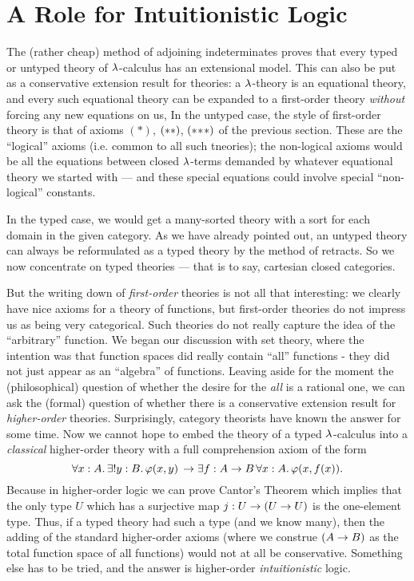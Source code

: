 \section{A Role for Intuitionistic Logic}

The (rather cheap) method of adjoining indeterminates proves that every typed or untyped theory of $\l$-calculus has an extensional model. This can also be put as a conservative extension result for theories: a $\l$-theory is an equational theory, and every such equational theory can be expanded to a first-order theory {\it without} forcing any new equations on us,  In the untyped case, the style of first-order theory is that of axioms $(*)$, $\ss$, $\sss$ of the previous section. These are the ``logical'' axioms (i.e. common to all such tneories); the non-logical axioms would be all the equations between closed $\l$-terms demanded by whatever equational theory we started with --- and these special equations could involve special ``non-logical'' constants.

In the typed case, we would get a many-sorted theory with a sort for each domain in the given category. As we have already pointed out, an untyped theory can always be reformulated as a typed theory by the method of retracts. So we now concentrate on typed theories --- that is to say, cartesian closed categories.

But the writing down of {\it first-order} theories is not all that interesting: we clearly have nice axioms for a theory of functions, but first-order theories do not impress us as being very categorical. Such theories do not really capture the idea of the ``arbitrary'' function. We began our discussion with set theory, where the intention was that function spaces did really contain ``all'' functions - they did not just appear as an ``algebra'' of functions. Leaving aside for the moment the (philosophical) question of whether the desire for the {\it all} is a rational one, we can ask the (formal) question of whether there is a conservative extension result for {\it higher-order} theories. Surprisingly, category theorists have known the answer for some time.
Now we cannot hope to embed the theory of a typed $\l$-calculus into a {\it classical} higher-order theory with a full comprehension axiom of the form
$$
\forall x:A .\, \exists !y: B .\,  \ffam(x,y)  \, \to  \exists f: \AB \, \forall x: A .\, \ffam(x,f(x)).
$$
Because in higher-order logic we can prove Cantor's Theorem which implies that the only type $U$ which has a surjective map
$j : U \to \UU$ is the one-element type. Thus, if a typed theory had such a type (and we know many), then the adding of the
standard higher-order axioms (where we construe $(\AB)$ as the total function space of all functions) would not at all be conservative. Something else has to be tried, and the answer is higher-order {\it intuitionistic} logic.


